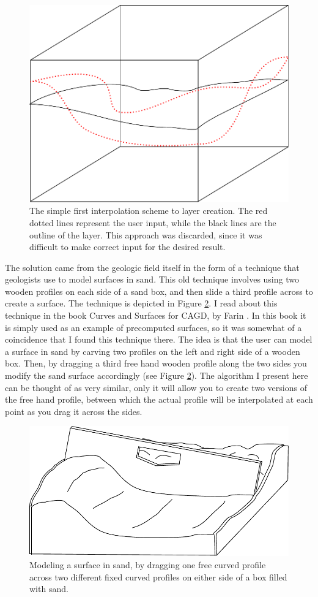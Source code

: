 \documentclass[a4paper,12pt]{report}
\begin{document}
\begin{figure}
 \centering
\includegraphics[width=.4\linewidth]{thesis/layerSimpleInterpol.pdf}
 \caption{The simple first interpolation scheme to layer creation. The red dotted lines represent the user input, while the black lines are the outline of the layer. This approach was discarded, since it was difficult to make correct input for the desired result.}
 \label{fig:layerSimpleInterpol}
\end{figure}

The solution came from the geologic field itself in the form of a technique that geologists use to model surfaces in sand. This old technique involves using two wooden profiles on each side of a sand box, and then slide a third profile across to create a surface. The technique is depicted in Figure \ref{fig:wooden}. I read about this technique in the book Curves and Surfaces for CAGD, by Farin \cite{farin2001curves}. In this book it is simply used as an example of precomputed surfaces, so it was somewhat of a coincidence that I found this technique there. The idea is that the user can model a surface in sand by carving two profiles on the left and right side of a wooden box. Then, by dragging a third free hand wooden profile along the two sides you modify the sand surface accordingly (see Figure \ref{fig:wooden}). The algorithm I present here can be thought of as very similar, only it will allow you to create two versions of the free hand profile, between which the actual profile will be interpolated at each 
point 
as you drag it across the sides.

\begin{figure}
\centering
 \includegraphics[width=0.8\linewidth]{thesis/sandbox.pdf}
 \caption{Modeling a surface in sand, by dragging one free curved profile across two different fixed curved profiles on either side of a box filled with sand.}
 \label{fig:wooden}
\end{figure}
\end{document}

